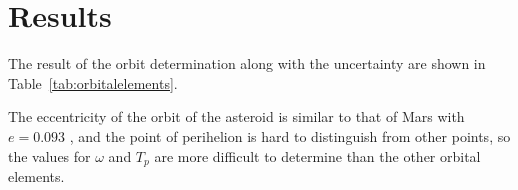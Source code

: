 \documentclass[12pt,journal,compsoc]{IEEEtran}
\begin{document}
\begin{table}[!t]
\centering
{}
\caption{V-magnitude of 1951 Lick \label{tab:vmag}}
\end{table}

\section{Results}

The result of the orbit determination along with the uncertainty are shown in Table~\ref{tab:orbitalelements}.

\begin{table}[!t]
\centering
{}
\caption{Measured orbital elements of 1951 Lick \label{tab:orbitalelements}}
\end{table}

The eccentricity of the orbit of the asteroid is similar to that of Mars with 
$e = 0.093$ \cite{bib:HORIZONS}, 
and the point of perihelion is hard to distinguish from other points, 
so the values for $\omega$ and $T_p$ are more difficult to determine than the other orbital elements.

\end{document}
